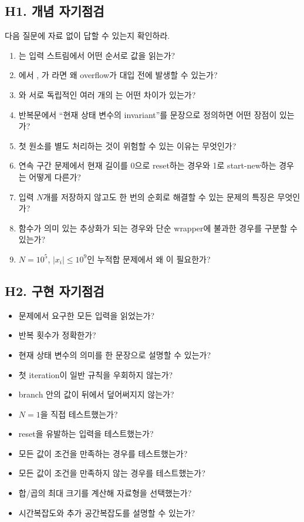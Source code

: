 \subsection{H1. 개념 자기점검}
다음 질문에 자료 없이 답할 수 있는지 확인하라.
\begin{enumerate}
  \item {}는 입력 스트림에서 어떤 순서로 값을 읽는가?
  \item {}에서 , 가 라면 왜 overflow가 대입 전에 발생할 수 있는가?
  \item {}와 서로 독립적인 여러 개의 는 어떤 차이가 있는가?
  \item 반복문에서 ``현재 상태 변수의 invariant''를 문장으로 정의하면 어떤 장점이 있는가?
  \item 첫 원소를 별도 처리하는 것이 위험할 수 있는 이유는 무엇인가?
  \item 연속 구간 문제에서 현재 길이를 0으로 reset하는 경우와 1로 start-new하는 경우는 어떻게 다른가?
  \item 입력 $N$개를 저장하지 않고도 한 번의 순회로 해결할 수 있는 문제의 특징은 무엇인가?
  \item 함수가 의미 있는 추상화가 되는 경우와 단순 wrapper에 불과한 경우를 구분할 수 있는가?
  \item $N=10^5$, $|x_i|\le10^9$인 누적합 문제에서 왜 이 필요한가?
\end{enumerate}

\subsection{H2. 구현 자기점검}
\begin{checklistbox}[코드 작성 후 체크리스트]
\begin{itemize}
  \item[$\square$] 문제에서 요구한 모든 입력을 읽었는가?
  \item[$\square$] 반복 횟수가 정확한가?
  \item[$\square$] 현재 상태 변수의 의미를 한 문장으로 설명할 수 있는가?
  \item[$\square$] 첫 iteration이 일반 규칙을 우회하지 않는가?
  \item[$\square$] branch 안의 값이 뒤에서 덮어써지지 않는가?
  \item[$\square$] $N=1$을 직접 테스트했는가?
  \item[$\square$] reset을 유발하는 입력을 테스트했는가?
  \item[$\square$] 모든 값이 조건을 만족하는 경우를 테스트했는가?
  \item[$\square$] 모든 값이 조건을 만족하지 않는 경우를 테스트했는가?
  \item[$\square$] 합/곱의 최대 크기를 계산해 자료형을 선택했는가?
  \item[$\square$] 시간복잡도와 추가 공간복잡도를 설명할 수 있는가?
\end{itemize}
\end{checklistbox}

